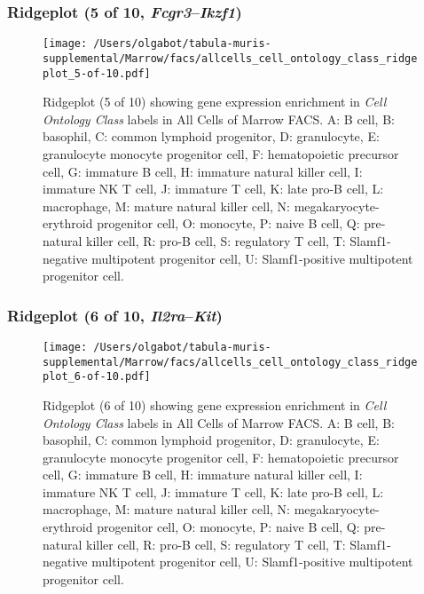\subsubsection{Ridgeplot (5 of 10, \emph{Fcgr3}--\emph{Ikzf1})}
\begin{figure}[h]
\centering
\texttt{[image: /Users/olgabot/tabula-muris-supplemental/Marrow/facs/allcells\_cell\_ontology\_class\_ridgeplot\_5-of-10.pdf]}

\caption{ Ridgeplot (5 of 10)  showing gene expression enrichment in \emph{Cell Ontology Class} labels in All Cells of Marrow FACS. A: B cell, B: basophil, C: common lymphoid progenitor, D: granulocyte, E: granulocyte monocyte progenitor cell, F: hematopoietic precursor cell, G: immature B cell, H: immature natural killer cell, I: immature NK T cell, J: immature T cell, K: late pro-B cell, L: macrophage, M: mature natural killer cell, N: megakaryocyte-erythroid progenitor cell, O: monocyte, P: naive B cell, Q: pre-natural killer cell, R: pro-B cell, S: regulatory T cell, T: Slamf1-negative multipotent progenitor cell, U: Slamf1-positive multipotent progenitor cell.}
\end{figure}


\clearpage

\subsubsection{Ridgeplot (6 of 10, \emph{Il2ra}--\emph{Kit})}
\begin{figure}[h]
\centering
\texttt{[image: /Users/olgabot/tabula-muris-supplemental/Marrow/facs/allcells\_cell\_ontology\_class\_ridgeplot\_6-of-10.pdf]}

\caption{ Ridgeplot (6 of 10)  showing gene expression enrichment in \emph{Cell Ontology Class} labels in All Cells of Marrow FACS. A: B cell, B: basophil, C: common lymphoid progenitor, D: granulocyte, E: granulocyte monocyte progenitor cell, F: hematopoietic precursor cell, G: immature B cell, H: immature natural killer cell, I: immature NK T cell, J: immature T cell, K: late pro-B cell, L: macrophage, M: mature natural killer cell, N: megakaryocyte-erythroid progenitor cell, O: monocyte, P: naive B cell, Q: pre-natural killer cell, R: pro-B cell, S: regulatory T cell, T: Slamf1-negative multipotent progenitor cell, U: Slamf1-positive multipotent progenitor cell.}
\end{figure}


\clearpage

